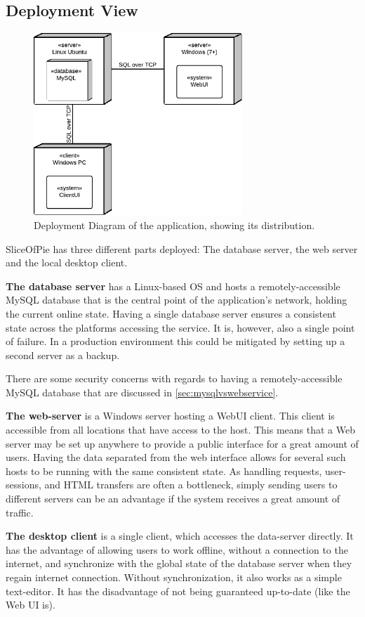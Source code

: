 \subsection{Deployment View}
\label{sec:deployment}

\begin{figure}[htb]
	\centering
	\includegraphics[width=0.7\textwidth]{Software_architecture/graphics/deployment-diag.png}
	\caption{Deployment Diagram of the application, showing its distribution.}
	\label{fig:deployment-diag}
\end{figure}

SliceOfPie has three different parts deployed: The database server, the web server and the local
desktop client.

{\bf The database server} has a Linux-based OS and hosts a remotely-accessible MySQL database
that is the central point of the application's network, holding the current online state. Having
a single database server ensures a consistent state across the platforms accessing the service.
It is, however, also a single point of failure. In a production environment this could be mitigated
by setting up a second server as a backup.

There are some security concerns with regards to having a remotely-accessible MySQL database that are
discussed in \ref{sec:mysqlvswebservice}.

{\bf The web-server} is a Windows server hosting a WebUI client. This client is accessible from all
locations that have access to the host. This means that a Web server may be set up anywhere to provide
a public interface for a great amount of users. Having the data separated from the web interface allows
for several such hosts to be running with the same consistent state. As handling requests, user-sessions,
and HTML transfers are often a bottleneck, simply sending users to different servers can be an advantage if the system receives a great
amount of traffic.

{\bf The desktop client} is a single client, which accesses the data-server directly. It has the advantage
of allowing users to work offline, without a connection to the internet, and synchronize with the global
state of the database server when they regain internet connection. Without synchronization, it also works
as a simple text-editor. It has the disadvantage of not being guaranteed up-to-date (like the Web UI is).